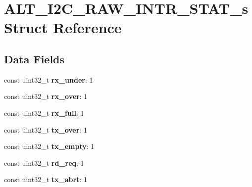 \hypertarget{structALT__I2C__RAW__INTR__STAT__s}{}\section{A\+L\+T\+\_\+\+I2\+C\+\_\+\+R\+A\+W\+\_\+\+I\+N\+T\+R\+\_\+\+S\+T\+A\+T\+\_\+s Struct Reference}
\label{structALT__I2C__RAW__INTR__STAT__s}
\subsection*{Data Fields}
\begin{DoxyCompactItemize}
\item 
\mbox{\label{structALT__I2C__RAW__INTR__STAT__s_af2fae175e67fe5a2054a3536688aec5d}} 
const uint32\+\_\+t {\bfseries rx\+\_\+under}\+: 1
\item 
\mbox{\label{structALT__I2C__RAW__INTR__STAT__s_a46c7e18cc8898c0ff04000d6da040eda}} 
const uint32\+\_\+t {\bfseries rx\+\_\+over}\+: 1
\item 
\mbox{\label{structALT__I2C__RAW__INTR__STAT__s_a8aca4e006a91c73be434d34b43ede59f}} 
const uint32\+\_\+t {\bfseries rx\+\_\+full}\+: 1
\item 
\mbox{\label{structALT__I2C__RAW__INTR__STAT__s_a14a67ab3291705b136b67b00458c9569}} 
const uint32\+\_\+t {\bfseries tx\+\_\+over}\+: 1
\item 
\mbox{\label{structALT__I2C__RAW__INTR__STAT__s_a07faa59ee21e48e694660134ef370132}} 
const uint32\+\_\+t {\bfseries tx\+\_\+empty}\+: 1
\item 
\mbox{\label{structALT__I2C__RAW__INTR__STAT__s_af55ecaaf58e8ecd739dc21c5fd5e6d4c}} 
const uint32\+\_\+t {\bfseries rd\+\_\+req}\+: 1
\item 
\mbox{\label{structALT__I2C__RAW__INTR__STAT__s_a84248e3c150c737742b6b52a46162fa3}} 
const uint32\+\_\+t {\bfseries tx\+\_\+abrt}\+: 1
\item 
\mbox{\label{structALT__I2C__RAW__INTR__STAT__s_ac5a3bb2a111ec9eaef164e42d0d16736}} 

\end{DoxyCompactItemize}
